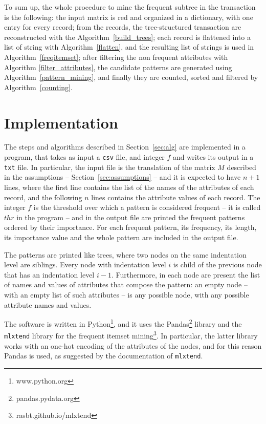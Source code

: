 \documentclass{acm_proc_article-sp-sigmod09}
\begin{document}
To sum up, the whole procedure to mine the frequent subtree in the transaction is the following: the input matrix is red and organized in a dictionary, with one entry for every record; from the records, the tree-structured transaction are reconstructed with the Algorithm~\ref{build_trees}; each record is flattened into a list of string with Algorithm~\ref{flatten}, and the resulting list of strings is used in Algorithm~\ref{freqitemset}; after filtering the non frequent attributes with Algorithm \ref{filter_attributes}, the candidate patterns are generated using Algorithm~\ref{pattern_mining}, and finally they are counted, sorted and filtered by Algorithm~\ref{counting}.

\section{Implementation}
The steps and algorithms described in Section~\ref{sec:alg} are implemented in a program, that takes as input a \texttt{csv} file, and integer $f$ and writes its output in a \texttt{txt} file. In particular, the input file is the translation of the matrix $M$ described in the assumptions -- Section~\ref{sec:assumptions} -- and it is expected to have $n + 1$ lines, where the first line contains the list of the names of the attributes of each record, and the following $n$ lines contains the attribute values of each record. The integer $f$ is the threshold over which a pattern is considered frequent -- it is called $thr$ in the program -- and in the output file are printed the frequent patterns ordered by their importance. For each frequent pattern, its frequency, its length, its importance value and the whole pattern are included in the output file. 

The patterns are printed like trees, where two nodes on the same indentation level are siblings. Every node with indentation level $i$ is child of the previous node that has an indentation level $i - 1$. Furthermore, in each node are present the list of names and values of attributes that compose the pattern: an empty node -- with an empty list of such attributes -- is any possible node, with any possible attribute names and values.

The software is written in Python\footnote{www.python.org}, and it uses the Pandas\footnote{pandas.pydata.org} library \cite{mckinney2010data} and the \texttt{mlxtend} library for the frequent itemset mining\footnote{rasbt.github.io/mlxtend}. In particular, the latter library works with an one-hot encoding of the attributes of the nodes, and for this reason Pandas is used, as suggested by the documentation of \texttt{mlxtend}.
\end{document}
